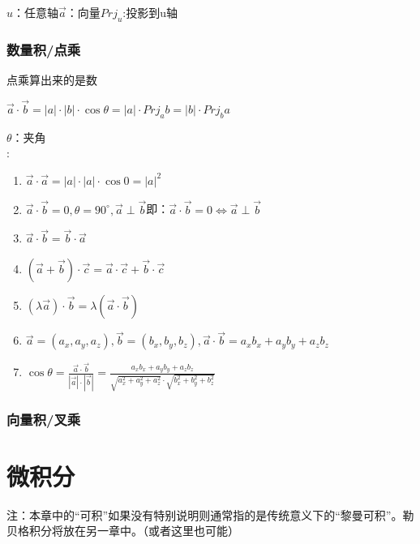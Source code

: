 \documentclass[UTF8]{ctexbook}
\newcommand{\degree}{^\circ}
\newcommand{\projection}[1]{Prj_{#1}}
\begin{document}
{{{{      $u$：任意轴\qquad$\vec{a}$：向量\qquad$\projection{u}$:投影到u轴

    }%

    \subsubsection{数量积/点乘}{
      点乘算出来的是数

      $\vec{a} \cdot \vec{b} = |a|\cdot|b|\cdot\cos\theta = |a|\cdot\projection{a}b = |b|\cdot\projection{b}a$

      $\theta$：夹角\\

      :
      \begin{enumerate}
        \item $\vec{a}\cdot\vec{a} = |a|\cdot|a|\cdot\cos0 = |a|^2$
        \item $\vec{a}\cdot\vec{b} = 0,\theta = 90\degree,\vec{a} \perp \vec{b}$\qquad 即：$\vec{a}\cdot\vec{b} = 0 \Leftrightarrow \vec{a} \perp \vec{b}$
        \item $\vec{a}\cdot\vec{b} = \vec{b}\cdot\vec{a}$
        \item $(\vec{a}+\vec{b})\cdot\vec{c} = \vec{a}\cdot\vec{c} + \vec{b}\cdot\vec{c}$
        \item $(\lambda\vec{a})\cdot\vec{b} = \lambda(\vec{a}\cdot\vec{b})$
        \item $\vec{a} = (a_x,a_y,a_z),\vec{b} = (b_x,b_y,b_z),\vec{a}\cdot\vec{b} = a_xb_x + a_yb_y + a_zb_z$
        \item $\cos\theta = \frac{\vec{a}\cdot\vec{b}}{|\vec{a}|\cdot|\vec{b}|} = \frac{a_xb_x + a_yb_y + a_zb_z}{\sqrt{a_x^2 + a_y^2 + a_z^2}\cdot\sqrt{b_x^2 + b_y^2 + b_z^2}}$
      \end{enumerate}

    }%

    \subsubsection{向量积/叉乘}{

    }%

  }%

 }%

\section{微积分}{
注：本章中的“可积”如果没有特别说明则通常指的是传统意义下的“黎曼可积”。勒贝格积分将放在另一章中。（或者这里也可能）

}}
\end{document}
